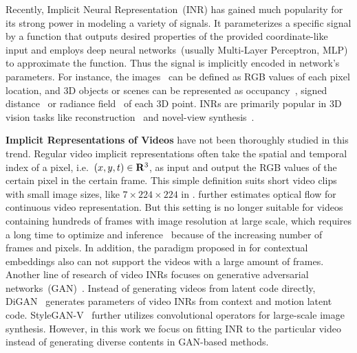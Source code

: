 \documentclass[runningheads]{llncs}
\begin{document}
Recently, Implicit Neural Representation~(INR) has gained much popularity for its strong power in modeling a variety of signals. It parameterizes a specific signal by a function that outputs desired properties of the provided coordinate-like input and employs deep neural networks~(usually Multi-Layer Perceptron, MLP) to approximate the function. Thus the signal is implicitly encoded in network's parameters. For instance, the images~\cite{chen2021learning,mehta2021modulated,sitzmann2020implicit} can be defined as RGB values of each pixel location, and 3D objects or scenes can be represented as occupancy~\cite{mescheder2019occupancy,peng2020convolutional}, signed distance~\cite{park2019deepsdf} or radiance field~\cite{mildenhall2020nerf} of each 3D point. INRs are primarily popular in 3D vision tasks like reconstruction~\cite{littwin2019deep,niemeyer2020differentiable,wang2021neus,park2021nerfies,pumarola2021d,li2021neural,xian2021space} and novel-view synthesis~\cite{mildenhall2020nerf,yu2021pixelnerf,barron2021mip,yu2021plenoctrees,tancik2022block}.

\textbf{Implicit Representations of Videos} have not been thoroughly studied in this trend. Regular video implicit representations often take the spatial and temporal index of a pixel, i.e.\ $(x,y,t)\in \mathbf{R}^3$, as input and output the RGB values of the certain pixel in the certain frame. This simple definition suits short video clips with small image sizes, like $7\times 224\times 224$ in \cite{sitzmann2020implicit,mehta2021modulated}.\cite{rho2022neural} further estimates optical flow for continuous video representation. But this setting is no longer suitable for videos containing hundreds of frames with image resolution at large scale, which requires a long time to optimize and inference~\cite{chen2021nerv} because of the increasing number of frames and pixels. In addition, the paradigm proposed in \cite{mehta2021modulated} for contextual embeddings also can not support the videos with a large amount of frames. Another line of research of video INRs focuses on generative adversarial networks~(GAN)~\cite{goodfellow2014generative}. Instead of generating videos from latent code directly, DiGAN~\cite{yu2021generating} generates parameters of video INRs from context and motion latent code. StyleGAN-V~\cite{skorokhodov2021stylegan} further utilizes convolutional operators for large-scale image synthesis. However, in this work we focus on fitting INR to the particular video instead of generating diverse contents in GAN-based methods.
\end{document}
